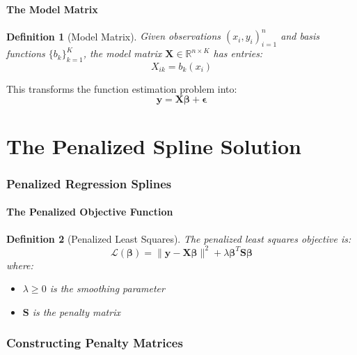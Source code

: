 \documentclass[12pt]{article}
\newtheorem{definition}{Definition}
\newcommand{\R}{\mathbb{R}}
\begin{document}
\subsection{The Model Matrix}

\begin{definition}[Model Matrix]
Given observations $(x_i, y_i)_{i=1}^n$ and basis functions $\{b_k\}_{k=1}^K$, the model matrix $\mathbf{X} \in \R^{n \times K}$ has entries:
\begin{equation}
X_{ik} = b_k(x_i)
\end{equation}
\end{definition}

This transforms the function estimation problem into:
\begin{equation}
\mathbf{y} = \mathbf{X}\bm{\beta} + \bm{\epsilon}
\end{equation}

\part{The Penalized Spline Solution}

\section{Penalized Regression Splines}

\subsection{The Penalized Objective Function}

\begin{definition}[Penalized Least Squares]
The penalized least squares objective is:
\begin{equation}
\mathcal{L}(\bm{\beta}) = \|\mathbf{y} - \mathbf{X}\bm{\beta}\|^2 + \lambda \bm{\beta}^T \mathbf{S} \bm{\beta}
\end{equation}
where:
\begin{itemize}
    \item $\lambda \geq 0$ is the smoothing parameter
    \item $\mathbf{S}$ is the penalty matrix
\end{itemize}
\end{definition}

\section{Constructing Penalty Matrices}
\end{document}

